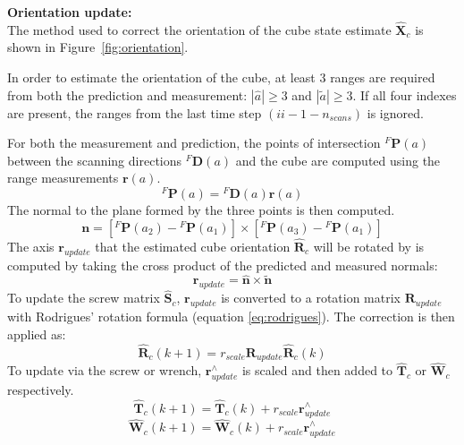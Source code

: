 		\textbf{Orientation update:}\\
			The method used to correct the orientation of the cube state estimate $\hat{\mathbf{X}}_c$ is shown in Figure~\ref{fig:orientation}. 
						
			In order to estimate the orientation of the cube, at least 3 ranges are required from both the prediction and measurement:
			$|\hat{a}| \geq 3$ and $|\tilde{a}| \geq 3$. If all four indexes are present, the ranges from the last time step $(ii-1-n_{scans})$ is ignored.
	
			For both the measurement and prediction, the points of intersection $^{F}\mathbf{P}(a)$ between the scanning directions ${^{F}\mathbf{D}(a)}$ and the cube are computed using the range measurements $\mathbf{r}(a)$.
			\begin{equation}
				^{F}\mathbf{P}(a) = {^{F}\mathbf{D}(a)}\mathbf{r}(a)
			\end{equation}
			The normal to the plane formed by the three points is then computed.
			\begin{equation}
				\mathbf{n} = [{^{F}\mathbf{P}}(a_2) - {^{F}\mathbf{P}}(a_1)] \times [{^{F}\mathbf{P}}(a_3) - {^{F}\mathbf{P}}(a_1)]
			\end{equation}
			The axis $\mathbf{r}_{update}$ that the estimated cube orientation $\hat{\mathbf{R}}_c$ will be rotated by is computed by taking the cross product of the predicted and measured normals:\\
			\begin{equation}
				\mathbf{r}_{update} = \hat{\mathbf{n}} \times \tilde{\mathbf{n}}
			\end{equation}
			To update the screw matrix $\hat{\mathbf{S}}_c$, $\mathbf{r}_{update}$ is converted to a rotation matrix $\mathbf{R}_{update}$ with Rodrigues' rotation formula (equation \ref{eq:rodrigues}). The correction is then applied as:
			\begin{equation}
				\hat{\mathbf{R}}_{c}(k+1) = r_{scale}\mathbf{R}_{update}\hat{\mathbf{R}}_{c}(k)
			\end{equation}
			To update via the screw or wrench, $\mathbf{r}_{update}^{\wedge}$ is scaled and then added to $\hat{\mathbf{T}}_c$ or $\hat{\mathbf{W}}_c$ respectively.
			\begin{equation}
				\hat{\mathbf{T}}_{c}(k+1) = \hat{\mathbf{T}}_{c}(k) + r_{scale}\mathbf{r}_{update}^{\wedge}
			\end{equation}
			\begin{equation}
				\hat{\mathbf{W}}_{c}(k+1) = \hat{\mathbf{W}}_{c}(k) + r_{scale}\mathbf{r}_{update}^{\wedge}
			\end{equation}
			
